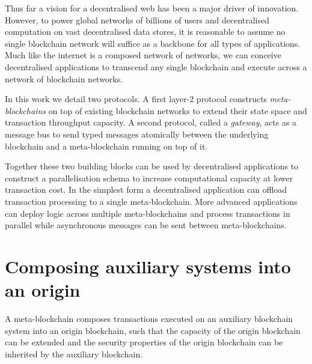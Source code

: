 \documentclass[12pt,a4paper]{article}
\begin{document}

Thus far a vision for a decentralised web has been a major driver of innovation. However, to power global networks of billions of users and decentralised computation on vast decentralised data stores, it is reasonable to assume no single blockchain network will suffice as a backbone for all types of applications. Much like the internet is a composed network of networks, we can conceive decentralised applications to transcend any single blockchain and execute across a network of blockchain networks.

In this work we detail two protocols. A first layer-2 protocol constructs \emph{meta-blockchains} on top of existing blockchain networks to extend their state space and transaction throughput capacity. A second protocol, called a \emph{gateway}, acts as a message bus to send typed messages atomically between the underlying blockchain and a meta-blockchain running on top of it.

Together these two building blocks can be used by decentralised applications to construct a parallelisation schema to increase %
computational capacity at lower transaction cost.  In the simplest form a decentralised application can offload transaction processing to a single meta-blockchain. More advanced applications can deploy logic across multiple meta-blockchains and process transactions in parallel while asynchronous messages can be sent between meta-blockchains.



\newpage
\section{Composing auxiliary systems into an origin}

A meta-blockchain composes transactions executed on an auxiliary blockchain system into an origin blockchain, such that the capacity of the origin blockchain can be extended and the security properties of the origin blockchain can be inherited by the auxiliary blockchain.
\end{document}
